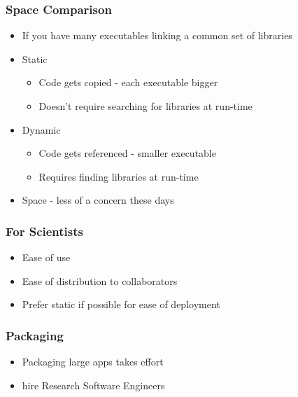 \subsubsection{Space Comparison}\label{space-comparison}

\begin{itemize}
\itemsep1pt\parskip0pt
\item
  If you have many executables linking a common set of libraries
\item
  Static

  \begin{itemize}
  \itemsep1pt\parskip0pt
  \item
    Code gets copied - each executable bigger
  \item
    Doesn't require searching for libraries at run-time
  \end{itemize}
\item
  Dynamic

  \begin{itemize}
  \itemsep1pt\parskip0pt
  \item
    Code gets referenced - smaller executable
  \item
    Requires finding libraries at run-time
  \end{itemize}
\item
  Space - less of a concern these days
\end{itemize}

\subsubsection{For Scientists}\label{for-scientists}

\begin{itemize}
\itemsep1pt\parskip0pt
\item
  Ease of use
\item
  Ease of distribution to collaborators
\item
  Prefer static if possible for ease of deployment
\end{itemize}

\subsubsection{Packaging}\label{packaging}

\begin{itemize}
\itemsep1pt\parskip0pt
\item
  Packaging large apps takes effort
\item
  hire Research Software Engineers
\end{itemize}

